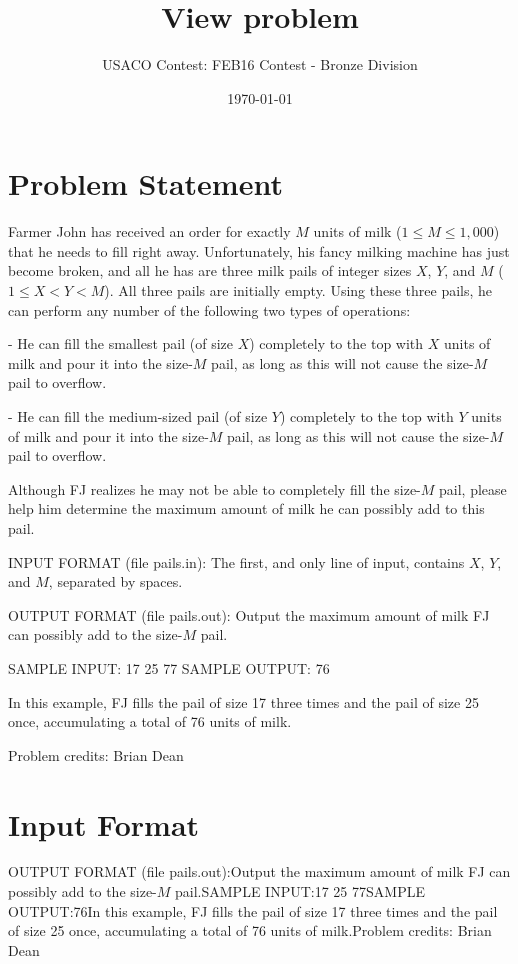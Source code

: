 \documentclass[12pt]{article}
\title{View problem}
\author{USACO Contest: FEB16 Contest - Bronze Division}
\date{\today}
\begin{document}
\maketitle

\section*{Problem Statement}

Farmer John has received an order for exactly $M$ units of milk
($1 \leq M \leq 1,000$) that he needs to fill right away.  Unfortunately, his
fancy milking machine has just become broken, and all he has are three milk
pails of integer sizes $X$, $Y$, and $M$ ($1 \leq X < Y < M$). All three pails
are initially empty.  Using these three pails, he can perform any number of the
following two types of operations:

- He can fill the smallest pail (of size $X$) completely to the top with $X$
units of milk and pour it into the size-$M$ pail, as long as this will not cause
the size-$M$ pail to overflow.

- He can fill the medium-sized pail (of size $Y$) completely to the top with $Y$
units of milk and pour it into the size-$M$ pail, as long as this will not cause
the size-$M$ pail to overflow.

Although FJ realizes he may not be able to completely fill the size-$M$ pail,
please help him determine the maximum amount of milk he can possibly add to this
pail.

INPUT FORMAT (file pails.in):
The first, and only line of input, contains $X$, $Y$, and $M$, separated by spaces.

OUTPUT FORMAT (file pails.out):
Output the maximum amount of milk FJ can possibly add to the size-$M$ pail.

SAMPLE INPUT:
17 25 77
SAMPLE OUTPUT: 
76

In this example, FJ fills the pail of size 17 three times and the pail of size
25 once, accumulating a total of 76 units of milk.

Problem credits: Brian Dean



\section*{Input Format}
OUTPUT FORMAT (file pails.out):Output the maximum amount of milk FJ can possibly add to the size-$M$ pail.SAMPLE INPUT:17 25 77SAMPLE OUTPUT:76In this example, FJ fills the pail of size 17 three times and the pail of size
25 once, accumulating a total of 76 units of milk.Problem credits: Brian Dean
\end{document}
